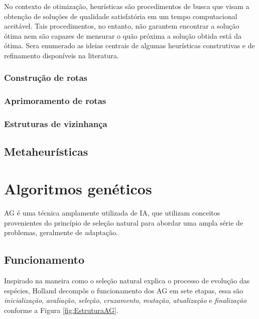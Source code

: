 No contexto de otimização, heurísticas são procedimentos de busca que visam a obtenção de soluções de qualidade satisfatória em um tempo computacional aceitável. Tais procedimentos, no entanto, não garantem encontrar a solução ótima nem são capazes de mensurar o quão próxima a solução obtida está da ótima. Sera enumerado as ideias centrais de algumas heurísticas construtivas e de refinamento disponíveis na literatura.


\subsubsection{Construção de rotas}
\subsubsection{Aprimoramento de rotas}
\subsubsection{Estruturas de vizinhança}

\subsection{Metaheurísticas}

\section{Algoritmos genéticos}

AG é uma técnica amplamente utilizada de IA, que utilizam conceitos provenientes do princípio de seleção natural para abordar uma  ampla série de problemas, geralmente de adaptação. \cite{DiogoCLucas}

\subsection{Funcionamento}
 
Inspirado na maneira como o seleção natural explica o processo de evolução das espécies, Holland \cite{Holland1975} decompôs o funcionamento dos AG em sete etapas, essa são \textit{inicialização}, \textit{avaliação}, \textit{seleção}, \textit{cruzamento}, \textit{mutação}, \textit{atualização} e  \textit{finalização} conforme a Figura \ref{fig:EstruturaAG}. 

